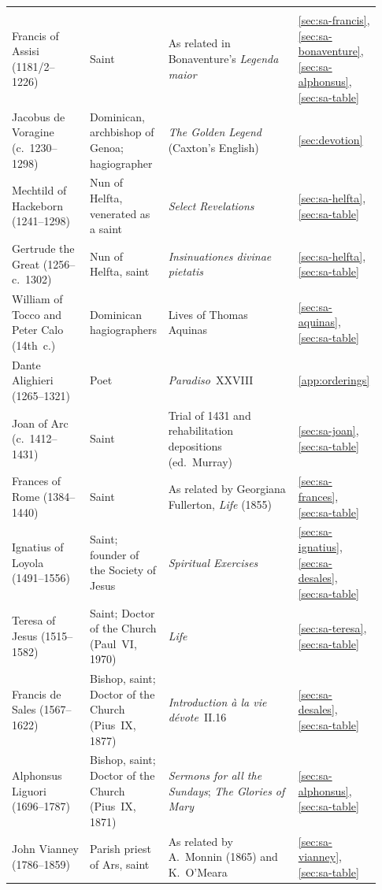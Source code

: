 \begin{longtable}{@{}>{\raggedright\arraybackslash}p{0.21\linewidth}>{\raggedright\arraybackslash}p{0.20\linewidth}>{\raggedright\arraybackslash}p{0.35\linewidth}>{\raggedright\arraybackslash}p{0.17\linewidth}@{}}
\addlinespace[4pt]
\multicolumn{4}{@{}l}{\textbf{Saints, spiritual writers, and their witnesses}}\\*
\addlinespace[2pt]
Francis of Assisi (1181/2--1226) & Saint & As related in Bonaventure's \emph{Legenda maior} & \ref{sec:sa-francis}, \ref{sec:sa-bonaventure}, \ref{sec:sa-alphonsus}, \ref{sec:sa-table}\\
Jacobus de Voragine (c.~1230--1298) & Dominican, archbishop of Genoa; hagiographer & \emph{The Golden Legend} (Caxton's English) & \ref{sec:devotion}\\
Mechtild of Hackeborn (1241--1298) & Nun of Helfta, venerated as a saint & \emph{Select Revelations} & \ref{sec:sa-helfta}, \ref{sec:sa-table}\\
Gertrude the Great (1256--c.~1302) & Nun of Helfta, saint & \emph{Insinuationes divinae pietatis} & \ref{sec:sa-helfta}, \ref{sec:sa-table}\\
William of Tocco and Peter Calo (14th~c.) & Dominican hagiographers & Lives of Thomas Aquinas & \ref{sec:sa-aquinas}, \ref{sec:sa-table}\\
Dante Alighieri (1265--1321) & Poet & \emph{Paradiso}~XXVIII & \ref{app:orderings}\\
Joan of Arc (c.~1412--1431) & Saint & Trial of 1431 and rehabilitation depositions (ed.\ Murray) & \ref{sec:sa-joan}, \ref{sec:sa-table}\\
Frances of Rome (1384--1440) & Saint & As related by Georgiana Fullerton, \emph{Life} (1855) & \ref{sec:sa-frances}, \ref{sec:sa-table}\\
Ignatius of Loyola (1491--1556) & Saint; founder of the Society of Jesus & \emph{Spiritual Exercises} & \ref{sec:sa-ignatius}, \ref{sec:sa-desales}, \ref{sec:sa-table}\\
Teresa of Jesus (1515--1582) & Saint; Doctor of the Church (Paul~VI, 1970) & \emph{Life} & \ref{sec:sa-teresa}, \ref{sec:sa-table}\\
Francis de Sales (1567--1622) & Bishop, saint; Doctor of the Church (Pius~IX, 1877) & \emph{Introduction \`a la vie d\'evote}~II.16 & \ref{sec:sa-desales}, \ref{sec:sa-table}\\
Alphonsus Liguori (1696--1787) & Bishop, saint; Doctor of the Church (Pius~IX, 1871) & \emph{Sermons for all the Sundays}; \emph{The Glories of Mary} & \ref{sec:sa-alphonsus}, \ref{sec:sa-table}\\
John Vianney (1786--1859) & Parish priest of Ars, saint & As related by A.~Monnin (1865) and K.~O'Meara & \ref{sec:sa-vianney}, \ref{sec:sa-table}\\

\end{longtable}
